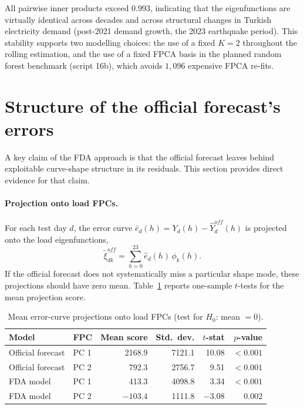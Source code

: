 \documentclass[10pt,a4paper]{article}
\begin{document}
\fontsize{9.2}{10.8}\selectfont

\noindent All pairwise inner products exceed 0.993, indicating that the eigenfunctions are virtually identical across decades and across structural changes in Turkish electricity demand (post-2021 demand growth, the 2023 earthquake period). This stability supports two modelling choices: the use of a fixed \(K = 2\) throughout the rolling estimation, and the use of a fixed FPCA basis in the planned random forest benchmark (script 16b), which avoids \(1{,}096\) expensive FPCA re-fits.

\section*{Structure of the official forecast's errors}

A key claim of the FDA approach is that the official forecast leaves behind exploitable curve-shape structure in its residuals. This section provides direct evidence for that claim.

\paragraph{Projection onto load FPCs.}  For each test day \(d\), the error curve \(\widehat e_d(h) = Y_d(h) - \widehat Y^{off}_d(h)\) is projected onto the load eigenfunctions,
\[
\tilde\xi_{dk}^{off} = \sum_{h=0}^{23}\widehat e_d(h)\,\phi_k(h).
\]
If the official forecast does not systematically miss a particular shape mode, these projections should have zero mean. Table~\ref{tab:score_tests} reports one-sample \(t\)-tests for the mean projection score.

\begin{table}[h]
\centering
\fontsize{8.2}{9.5}\selectfont
\caption{Mean error-curve projections onto load FPCs (test for \(H_0\): mean \(= 0\)).}
\label{tab:score_tests}
\begin{tabular}{llrrrr}
\toprule
Model & FPC & Mean score & Std.\ dev. & $t$-stat & $p$-value\\
\midrule
Official forecast & PC 1 & 2168.9 & 7121.1 & 10.08 & \(< 0.001\)\\
Official forecast & PC 2 &  792.3 & 2756.7 &  9.51 & \(< 0.001\)\\
\midrule
FDA model         & PC 1 &  413.3 & 4098.8 &  3.34 & \(< 0.001\)\\
FDA model         & PC 2 & \(-103.4\) & 1111.8 & \(-3.08\) & 0.002\\
\bottomrule
\end{tabular}
\end{table}
\end{document}
